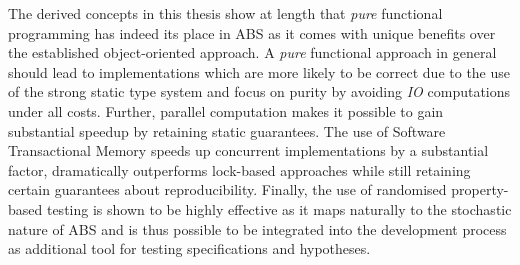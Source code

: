 The derived concepts in this thesis show at length that \textit{pure} functional programming has indeed its place in ABS as it comes with unique benefits over the established object-oriented approach. A \textit{pure} functional approach in general should lead to implementations which are more likely to be correct due to the use of the strong static type system and focus on purity by avoiding \textit{IO} computations under all costs. Further, parallel computation makes it possible to gain substantial speedup by retaining static guarantees. The use of Software Transactional Memory speeds up concurrent implementations by a substantial factor, dramatically outperforms lock-based approaches while still retaining certain guarantees about reproducibility. Finally, the use of randomised property-based testing is shown to be highly effective as it maps naturally to the stochastic nature of ABS and is thus possible to be integrated into the development process as additional tool for testing specifications and hypotheses.

